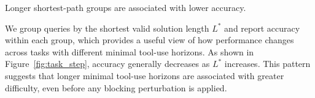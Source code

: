 \documentclass{llmxive}
\begin{document}





\begin{takeaway}[label={tak:analysis-path-length}]
Longer shortest-path groups are associated with lower accuracy.
\end{takeaway}


\noindent We group queries by the shortest valid solution length $L^*$ and report accuracy within each group, which provides a useful view of how performance changes across tasks with different minimal tool-use horizons. 
As shown in Figure~\ref{fig:task_step}, accuracy generally decreases as $L^*$ increases.
This pattern suggests that longer minimal tool-use horizons are associated with greater difficulty, even before any blocking perturbation is applied.
\end{document}
